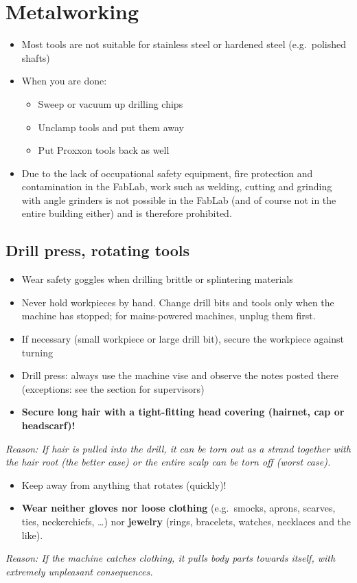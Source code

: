 \documentclass[13pt]{\basedir/fablab-document}
\begin{document}
\section{Metalworking}
\begin{itemize}
	\item Most tools are not suitable for stainless steel or hardened steel (e.g.\ polished shafts)
	\item When you are done:
	\begin{itemize}
		\item Sweep or vacuum up drilling chips
		\item Unclamp tools and put them away
		\item Put Proxxon tools back as well
	\end{itemize}
	\item Due to the lack of occupational safety equipment, fire protection and contamination in the FabLab, work such as welding, cutting and grinding with angle grinders is not possible in the FabLab (and of course not in the entire building either) and is therefore prohibited.
\end{itemize}


\subsection{Drill press, rotating tools}

\begin{itemize}
	\item Wear safety goggles when drilling brittle or splintering materials
	\item Never hold workpieces by hand. Change drill bits and tools only when the machine has stopped; for mains-powered machines, unplug them first.
	\item If necessary (small workpiece or large drill bit), secure the workpiece against turning
	\item Drill press: always use the machine vise and observe the notes posted there (exceptions: see the section for supervisors)
	\item \textbf{Secure long hair with a tight-fitting head covering (hairnet, cap or headscarf)!}
\end{itemize}
\textit{Reason: If hair is pulled into the drill, it can be torn out as a strand together with the hair root (the better case) or the entire scalp can be torn off (worst case).}

\begin{itemize}
	\item Keep away from anything that rotates (quickly)!
	\item \textbf{Wear neither gloves nor loose clothing} (e.g.\ smocks, aprons, scarves, ties, neckerchiefs, \dots) nor \textbf{jewelry} (rings, bracelets, watches, necklaces and the like).
\end{itemize}
\textit{Reason: If the machine catches clothing, it pulls body parts towards itself, with extremely unpleasant consequences.}
\end{document}
